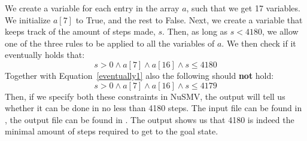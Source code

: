 We create a variable for each entry in the array $a$, such that we get 17 variables. We initialize $a[7]$ to True, and the rest to False. Next, we create a variable that keeps track of the amount of steps made, $s$. Then, as long as $s < 4180$, we allow one of the three rules to be applied to all the variables of $a$. We then check if it eventually holds that:
\begin{equation}
    \label{eventually1}
    s > 0 \wedge a[7] \wedge a[16] \wedge s \leq 4180
\end{equation}
Together with Equation~\ref{eventually1} also the following should \textbf{not} hold:
\begin{equation}
    \label{eventually2}
    s > 0 \wedge a[7] \wedge a[16] \wedge s \leq 4179
\end{equation}
Then, if we specify both these constraints in NuSMV, the output will tell us whether it can be done in no less than 4180 steps. The input file can be found in , the output file can be found in . The output shows us that 4180 is indeed the minimal amount of steps required to get to the goal state.